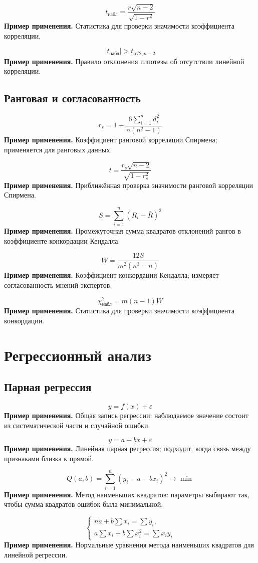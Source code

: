 \documentclass[a4paper,14pt]{extarticle}
\newcommand{\FormulaNote}[2]{%
  \begin{equation*}
  #1
  \end{equation*}
  \noindent\textbf{Пример применения.} #2\par\medskip
}
\begin{document}
\FormulaNote{t_{\text{набл}}=\frac{r\sqrt{n-2}}{\sqrt{1-r^2}}}{Статистика для проверки значимости коэффициента корреляции.}

\FormulaNote{|t_{\text{набл}}|>t_{\alpha/2,n-2}}{Правило отклонения гипотезы об отсутствии линейной корреляции.}

\subsection{Ранговая и согласованность}

\FormulaNote{r_s=1-\frac{6\sum_{i=1}^{n}d_i^2}{n(n^2-1)}}{Коэффициент ранговой корреляции Спирмена; применяется для ранговых данных.}

\FormulaNote{t=\frac{r_s\sqrt{n-2}}{\sqrt{1-r_s^2}}}{Приближённая проверка значимости ранговой корреляции Спирмена.}

\FormulaNote{S=\sum_{i=1}^{n}(R_i-\bar{R})^2}{Промежуточная сумма квадратов отклонений рангов в коэффициенте конкордации Кендалла.}

\FormulaNote{W=\frac{12S}{m^2(n^3-n)}}{Коэффициент конкордации Кендалла; измеряет согласованность мнений экспертов.}

\FormulaNote{\chi^2_{\text{набл}}=m(n-1)W}{Статистика для проверки значимости коэффициента конкордации.}

\section{Регрессионный анализ}

\subsection{Парная регрессия}

\FormulaNote{y=f(x)+\varepsilon}{Общая запись регрессии: наблюдаемое значение состоит из систематической части и случайной ошибки.}

\FormulaNote{y=a+bx+\varepsilon}{Линейная парная регрессия; подходит, когда связь между признаками близка к прямой.}

\FormulaNote{Q(a,b)=\sum_{i=1}^{n}(y_i-a-bx_i)^2\to\min}{Метод наименьших квадратов: параметры выбирают так, чтобы сумма квадратов ошибок была минимальной.}

\FormulaNote{
\begin{cases}
na+b\sum x_i=\sum y_i,\\
a\sum x_i+b\sum x_i^2=\sum x_i y_i
\end{cases}
}{Нормальные уравнения метода наименьших квадратов для линейной регрессии.}
\end{document}

